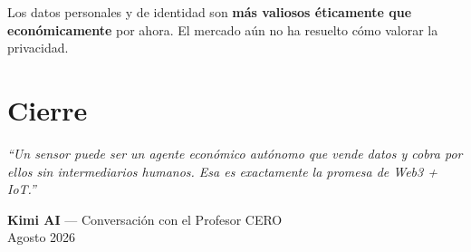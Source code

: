 \documentclass[12pt,a4paper]{article}
\begin{document}
Los datos personales y de identidad son \textbf{m\'{a}s valiosos \'{e}ticamente que econ\'{o}micamente} por ahora. El mercado a\'{u}n no ha resuelto c\'{o}mo valorar la privacidad.


\section*{Cierre}

\textit{``Un sensor puede ser un agente econ\'{o}mico aut\'{o}nomo que vende datos y cobra por ellos sin intermediarios humanos. Esa es exactamente la promesa de Web3 + IoT.''}

\vspace{1cm}
\begin{flushright}
\textbf{Kimi AI} --- Conversaci\'{o}n con el Profesor CERO\\
Agosto 2026
\end{flushright}
\end{document}
